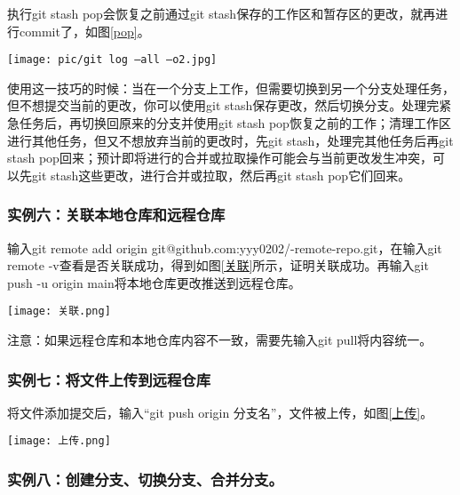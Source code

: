 \documentclass[a4paper]{article}
\begin{document}
执行git stash pop会恢复之前通过git stash保存的工作区和暂存区的更改，就再进行commit了，如图\ref{pop}。
\begin{figure*}[!htb]
    \centering
    \texttt{[image: pic/git log --all --o2.jpg]}
    \caption{git stash pop}
    \label{pop}
\end{figure*}

使用这一技巧的时候：当在一个分支上工作，但需要切换到另一个分支处理任务，但不想提交当前的更改，你可以使用git stash保存更改，然后切换分支。处理完紧急任务后，再切换回原来的分支并使用git stash pop恢复之前的工作；清理工作区进行其他任务，但又不想放弃当前的更改时，先git stash，处理完其他任务后再git stash pop回来；预计即将进行的合并或拉取操作可能会与当前更改发生冲突，可以先git stash这些更改，进行合并或拉取，然后再git stash pop它们回来。

\vspace{1em} 

 \subsubsection{实例六：关联本地仓库和远程仓库}

输入git remote add origin git@github.com:yyy0202/-remote-repo.git，在输入git remote -v查看是否关联成功，得到如图\ref{关联}所示，证明关联成功。再输入git push -u origin main将本地仓库更改推送到远程仓库。
\begin{figure*}[!htb]
    \centering
    \texttt{[image: 关联.png]}
    \caption{关联远程仓库}
    \label{关联}
\end{figure*}

注意：如果远程仓库和本地仓库内容不一致，需要先输入git pull将内容统一。

\vspace{1em} 
\subsubsection{实例七：将文件上传到远程仓库}
将文件添加提交后，输入“git push origin 分支名”，文件被上传，如图\ref{上传}。
\begin{figure*}[!htb]
    \centering
    \texttt{[image: 上传.png]}
    \caption{上传到远程仓库}
    \label{上传}
\end{figure*}
 \subsubsection{实例八：创建分支、切换分支、合并分支。}
\end{document}
